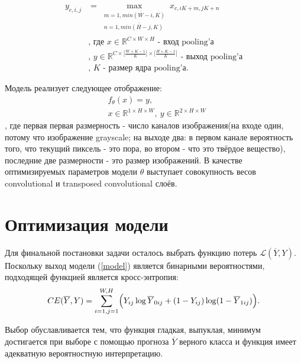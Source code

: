 \documentclass[14pt, a4paper, oneside, bold]{extarticle}
\begin{document}
\begin{equation} \label{pooling}
\begin{aligned}
	y_{c, i, j} & = \max \limits_{
		\substack{
			m=\overline{1, min(W - i, K)}
			\\ n=\overline{1, min(H - j, K)}}}
		x_{c, i K + m, j K + n} \\
	& \text{, где $x \in \mathbb{R}^{C \times W \times H}$ 
		- вход pooling'а} \\
	& \text{, $y \in \mathbb{R}
		^{C 
		  \times \bigl[ \frac{W + K - 1}{K} \bigr] 
		  \times \bigl[ \frac{H + K - 1}{K} \bigr] }$ 
		- выход pooling'а} \\
	& \text{, $K$ - размер ядра pooling'а}.
\end{aligned}
\end{equation}

Модель реализует следующее отображение: 
\begin{equation} \label{model}
\begin{aligned}
	& f_{\theta}(x) = y, \\
	& x \in \mathbb{R}^{1 \times H \times W}
		,\ y \in 
		\mathbb{R}^{2 \times H \times W}
\end{aligned}
\end{equation}
, где первая первая размерность - число каналов изображения(на входе один, потому что изображение grayscale; на выходе два: в первом канале вероятность того, что текущий пиксель - это пора, во втором - что это твёрдое вещество), последние две размерности - это размер изображений. В качестве оптимизируемых параметров модели $\theta$ выступает совокупность весов convolutional и transposed convolutional слоёв.

\newpage


\section{Оптимизация модели}

Для финальной постановки задачи осталось выбрать функцию потерь 
$\mathcal{L}(\overline{Y}, Y)$. Поскольку выход модели (\ref{model})
является бинарными вероятностями, подходящей функцией является кросс-энтропия:
\begin{equation} \label{cross-entropy}
	CE(\overline{Y}, Y) = \sum \limits_{i=1, j=1}^{W, H} \Bigl(
		Y_{ij} \log \overline{Y}_{0ij} 
		+ (1 - Y_{ij}) \log (1 - \overline{Y}_{1ij}) \Bigr).
\end{equation}

Выбор обуславливается тем, что функция гладкая, выпуклая, минимум достигается 
при выборе с помощью прогноза $\overline{Y}$ верного класса и функция 
имеет адекватную вероятностную интерпретацию.
\end{document}
